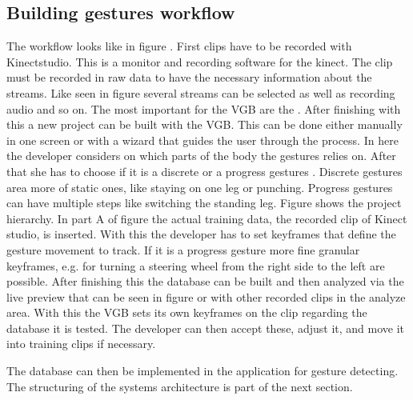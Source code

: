 \subsection{Building gestures workflow}
The workflow looks like in figure . First clips have to be recorded with Kinectstudio. This is a monitor and recording software for the kinect. The clip must be recorded in raw data to have the necessary information about the streams. Like seen in figure  several streams can be selected as well as recording audio and so on. The most important for the VGB are the . After finishing with this a new project can be built with the VGB. This can be done either manually in one screen or with a wizard that guides the user through the process. In here the developer considers on which parts of the body the gestures relies on. After that she has to choose if it is a discrete or a progress gestures . Discrete gestures area more of static ones, like staying on one leg or punching. Progress gestures can have multiple steps like switching the standing leg.
Figure  shows the project hierarchy. In part A of figure  the actual training data, the recorded clip of Kinect studio, is inserted. With this the developer has to set keyframes that define the gesture movement to track. If it is a progress gesture more fine granular keyframes, e.g. for turning a steering wheel from the right side to the left are possible. After finishing this the database can be built and then analyzed via the live preview that can be seen in figure  or with other recorded clips in the analyze area. With this the VGB sets its own keyframes on the clip regarding the database it is tested. The developer can then accept these, adjust it, and move it into training clips if necessary.

The database can then be implemented in the application for gesture detecting. The structuring of the systems architecture is part of the next section.
